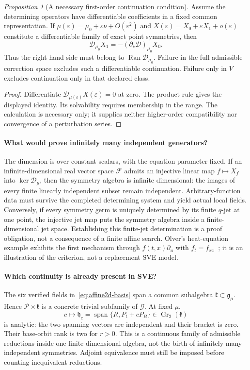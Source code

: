 \documentclass[12pt,a4paper,oneside]{report}
\numberwithin{equation}{chapter}
\theoremstyle{remark}\newtheorem{remark}[theorem]{Remark}
\newtheorem{suppprop}{Proposition}[chapter]
\begin{document}
\begin{suppprop}[A necessary first-order continuation condition]
\label{prop:generator-obstruction}
Assume the determining operators have differentiable coefficients in a
fixed common representation. If
$\mu(\varepsilon)=\mu_0+\varepsilon\nu+O(\varepsilon^2)$ and
$X(\varepsilon)=X_0+\varepsilon X_1+o(\varepsilon)$ constitute a
differentiable family of exact point symmetries, then
\[
 \mathscr D_{\mu_0}X_1
 =-(\partial_\nu\mathscr D)_{\mu_0}X_0.
\]
Thus the right-hand side must belong to $\operatorname{Ran}\mathscr D_{\mu_0}$.
Failure in the full admissible correction space excludes such a
differentiable continuation. Failure only in $V$ excludes continuation
only in that declared class.
\end{suppprop}
\begin{proof}
Differentiate $\mathscr D_{\mu(\varepsilon)}X(\varepsilon)=0$ at zero.
The product rule gives the displayed identity. Its solvability requires
membership in the range. The calculation is necessary only; it supplies
neither higher-order compatibility nor convergence of a perturbation series.
\end{proof}

\paragraph{What would prove infinitely many independent generators?}
The dimension is over constant scalars, with the equation parameter fixed.
If an infinite-dimensional real vector space $\mathcal F$ admits an
injective linear map $f\mapsto X_f$ into $\ker\mathscr D_\mu$, then the
symmetry algebra is infinite dimensional: the images of every finite
linearly independent subset remain independent. Arbitrary-function data
must survive the completed determining system and yield actual local
fields. Conversely, if every symmetry germ is uniquely determined by its
finite $q$-jet at one point, the injective jet map puts the symmetry algebra
inside a finite-dimensional jet space. Establishing this finite-jet
determination is a proof obligation, not a consequence of a finite affine
search. Olver's heat-equation example exhibits the first mechanism through
$f(t,x)\partial_u$ with $f_t=f_{xx}$~\cite[\S2.4]{olver}; it is an
illustration of the criterion, not a replacement SVE model.

\paragraph{Which continuity is already present in SVE?}
The six verified fields in~\eqref{eq:affine2d-basis} span a common subalgebra
$\mathfrak k\subset\mathfrak g_\mu$. Hence $\mathcal P\times\mathfrak k$
is a concrete trivial subfamily of $\mathscr G$. At fixed $\mu$,
\[
 c\longmapsto\mathfrak h_c
 =\operatorname{span}\{R,P_t+cP_B\}\in\operatorname{Gr}_2(\mathfrak k)
\]
is analytic: the two spanning vectors are independent and their bracket is
zero. Their base-orbit rank is two for $r>0$. This is a continuous family
of admissible reductions inside one finite-dimensional algebra, not the
birth of infinitely many independent symmetries. Adjoint equivalence must
still be imposed before counting inequivalent reductions.
\end{document}

